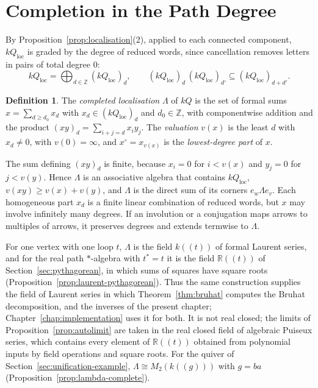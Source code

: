 \documentclass[12pt, a4paper]{report}
\theoremstyle{plain}
\theoremstyle{definition}
\newtheorem{definition}[theorem]{Definition}
\theoremstyle{remark}
\theoremstyle{plain}
\newcommand{\RR}{\mathbb{R}}
\newcommand{\ZZ}{\mathbb{Z}}
\begin{document}
\section{Completion in the Path Degree}
\label{sec:completion}
By Proposition~\ref{prop:localisation}(2), applied to each connected component, $kQ_{\mathrm{loc}}$ is graded by the degree of reduced words, since cancellation removes letters in pairs of total degree $0$:
\[ kQ_{\mathrm{loc}}=\bigoplus_{d\in\ZZ}(kQ_{\mathrm{loc}})_d,\qquad (kQ_{\mathrm{loc}})_d\,(kQ_{\mathrm{loc}})_{d'}\subseteq(kQ_{\mathrm{loc}})_{d+d'} . \]

\begin{definition}\label{def:completion}
The \emph{completed localisation} $\Lambda$ of $kQ$ is the set of formal sums $x=\sum_{d\geq d_0}x_d$ with $x_d\in(kQ_{\mathrm{loc}})_d$ and $d_0\in\ZZ$, with componentwise addition and the product $(xy)_d=\sum_{i+j=d}x_iy_j$. The \emph{valuation} $v(x)$ is the least $d$ with $x_d\neq0$, with $v(0)=\infty$, and $x^\circ=x_{v(x)}$ is the \emph{lowest-degree part} of $x$.
\end{definition}

The sum defining $(xy)_d$ is finite, because $x_i=0$ for $i<v(x)$ and $y_j=0$ for $j<v(y)$. Hence $\Lambda$ is an associative algebra that contains $kQ_{\mathrm{loc}}$, $v(xy)\geq v(x)+v(y)$, and $\Lambda$ is the direct sum of its corners $e_w\Lambda e_v$. Each homogeneous part $x_d$ is a finite linear combination of reduced words, but $x$ may involve infinitely many degrees. If an involution or a conjugation maps arrows to multiples of arrows, it preserves degrees and extends termwise to $\Lambda$.

For one vertex with one loop $t$, $\Lambda$ is the field $k((t))$ of formal Laurent series, and for the real path $*$-algebra with $t^*=t$ it is the field $\RR((t))$ of Section~\ref{sec:pythagorean}, in which sums of squares have square roots (Proposition~\ref{prop:laurent-pythagorean}). Thus the same construction supplies the field of Laurent series in which Theorem~\ref{thm:bruhat} computes the Bruhat decomposition, and the inverses of the present chapter; Chapter~\ref{chap:implementation} uses it for both. It is not real closed; the limits of Proposition~\ref{prop:autolimit} are taken in the real closed field of algebraic Puiseux series, which contains every element of $\RR((t))$ obtained from polynomial inputs by field operations and square roots. For the quiver of Section~\ref{sec:unification-example}, $\Lambda\cong M_2(k((g)))$ with $g=ba$ (Proposition~\ref{prop:lambda-complete}).
\end{document}
